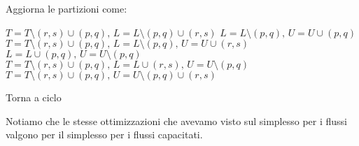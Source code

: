\documentclass[a4paper,11pt]{article}
\begin{document}
\begin{algorithm}
\begin{algorithmic}
	\STATE Aggiorna le partizioni come:
	
			\STATE $ T = T \setminus (r,s) \cup (p,q), \, L = L \setminus (p, q) \cup (r,s) $
		\ELSE
				\STATE $ L = L \setminus (p, q), \, U = U \cup (p, q) $
			\ELSE
				\STATE $ T = T \setminus (r,s) \cup (p,q), \, L = L \setminus (p, q), \, U = U \cup (r, s) $
			\ENDIF
		\ENDIF
	\ELSE
				\STATE $ L = L \cup (p, q), \, U = U \setminus (p, q) $
			\ELSE
				\STATE $ T = T \setminus (r,s) \cup (p,q), \, L = L \cup (r,s), \, U = U \setminus (p,q) $
			\ENDIF
		\ELSE
				\STATE $ T = T \setminus (r,s) \cup (p,q), \, U = U \setminus (p, q) \cup (r,s) $
		\ENDIF
	\ENDIF
	
	\STATE Torna a \textsf{ciclo}
\end{algorithmic}
\end{algorithm}

Notiamo che le stesse ottimizzazioni che avevamo visto sul simplesso per i flussi valgono per il simplesso per i flussi capacitati.
\end{document}
